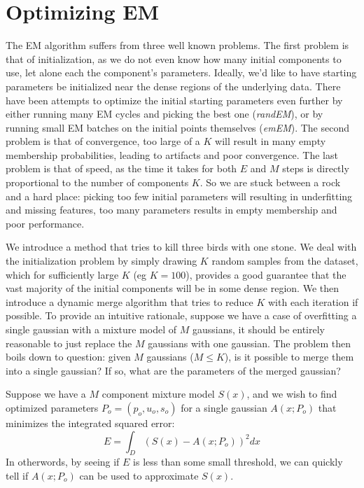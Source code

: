 \documentclass{acm_proc_article-sp}
\begin{document}
\section{Optimizing EM}
The EM algorithm suffers from three well known problems. The first problem is that of initialization, as we do not even know how many initial components to use, let alone each the component's parameters. Ideally, we'd like to have starting parameters be initialized near the dense regions of the underlying data. There have been attempts to optimize the initial starting parameters even further by either running many EM cycles and picking the best one ({\it randEM}), or by running small EM batches on the initial points themselves ({\it emEM}). The second problem is that of convergence, too large of a $K$ will result in many empty membership probabilities, leading to artifacts and poor convergence. The last problem is that of speed, as the time it takes for both $E$ and $M$ steps is directly proportional to the number of components $K$. So we are stuck between a rock and a hard place: picking too few initial parameters will resulting in underfitting and missing features, too many parameters results in empty membership and poor performance.

We introduce a method that tries to kill three birds with one stone. We deal with the initialization problem by simply drawing $K$ random samples from the dataset, which for sufficiently large $K$ (eg $K=100$), provides a good guarantee that the vast majority of the initial components will be in some dense region. We then introduce a dynamic merge algorithm that tries to reduce $K$ with each iteration if possible. To provide an intuitive rationale, suppose we have a case of overfitting a single gaussian with a mixture model of $M$ gaussians, it should be entirely reasonable to just replace the $M$ gaussians with one gaussian. The problem then boils down to question: given $M$ gaussians ($M \leq K$), is it possible to merge them into a single gaussian? If so, what are the parameters of the merged gaussian? 

Suppose we have a $M$ component mixture model $S(x)$, and we wish to find optimized parameters $P_o = (p_o, u_o, s_o)$ for a single gaussian $A(x; P_o)$ that minimizes the integrated squared error:
\begin{equation}
E = \int_D (S(x)-A(x; P_o))^2 dx
\end{equation}
In otherwords, by seeing if $E$ is less than some small threshold, we can quickly tell if $A(x; P_o)$ can be used to approximate $S(x)$. 
\end{document}
